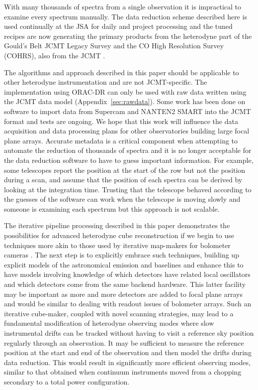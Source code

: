 \documentclass[a4paper,fleqn,usenatbib]{mnras}
\begin{document}
With many thousands of spectra from a single observation it is
impractical to examine every spectrum manually. The data reduction
scheme described here is used continually at the JSA
\citep{2011ASPC..442..203E,2014SPIE9152-93} for daily and project processing and the
tuned recipes are now generating the primary products from the
heterodyne part of the Gould's Belt JCMT Legacy Survey
\citep{2007PASP..119..855W} and the CO High Resolution Survey
(COHRS), also from the JCMT \citep{2013ApJS..209....8D}.

The algorithms and approach described in this paper should be
applicable to other heterodyne instrumentation and are not
JCMT-specific. The implementation using ORAC-DR can only be used with
raw data written using the JCMT data model
(Appendix~\ref{sec:rawdata}). Some work has been done on software to
import data from Supercam \citep{2012SPIE.8452E..04K} and NANTEN2
SMART \citep{2008stt..conf..488G} into the JCMT format and tests are
ongoing. We hope that this work will influence the data acquisition
and data processing plans for other observatories building large focal
plane arrays. Accurate metadata is a critical component when
attempting to automate the reduction of thousands of spectra and it is
no longer acceptable for the data reduction software to have to guess
important information. For example, some telescopes report the
position at the start of the row but not the position during a scan,
and assume that the position of each spectra can be derived by looking
at the integration time. Trusting that the telescope behaved according
to the guesses of the software can work when the telescope is moving
slowly and someone is examining each spectrum but this approach is not
scalable.

The iterative pipeline processing described in this paper demonstrates
the possibilities for advanced heterodyne cube reconstruction if we
begin to use techniques more akin to those used by iterative
map-makers for bolometer cameras
\citep[e.g.,][]{2013MNRAS.430.2545C}. The next step is to explicitly
embrace such techniques, building up explicit models of the
astronomical emission and baselines and enhance this to have models
involving knowledge of which detectors have related local oscillators
and which detectors come from the same backend hardware. This latter
facility may be important as more and more detectors are added to
focal plane arrays and would be similar to dealing with readout issues
of bolometer arrays. Such an iterative cube-maker, coupled with novel
scanning strategies, may lead to a fundamental modification of
heterodyne observing modes where slow instrumental drifts can be
tracked without having to visit a reference sky position regularly
through an observation. It may be sufficient to measure the reference
position at the start and end of the observation and then model the
drifts during data reduction. This would result in significantly more
efficient observing modes, similar to that obtained when continuum
instruments moved from a chopping secondary to a total power
configuration.
\end{document}
